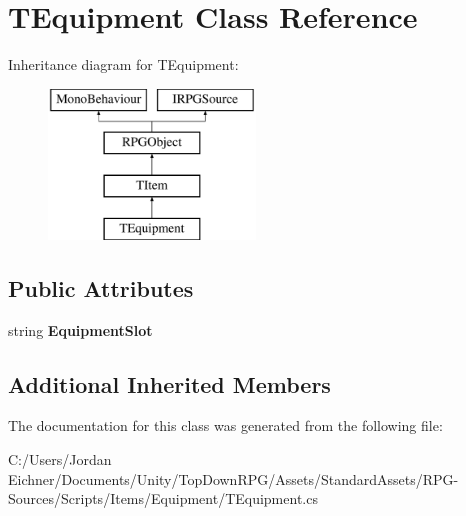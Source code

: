 \hypertarget{class_t_equipment}{}\section{T\+Equipment Class Reference}
\label{class_t_equipment}
Inheritance diagram for T\+Equipment\+:\begin{figure}[H]
\begin{center}
\leavevmode
\includegraphics[height=4.000000cm]{class_t_equipment}
\end{center}
\end{figure}
\subsection*{Public Attributes}
\begin{DoxyCompactItemize}
\item 
\hypertarget{class_t_equipment_a0649573d41f70f840da2b3888af650b3}{}string {\bfseries Equipment\+Slot}\label{class_t_equipment_a0649573d41f70f840da2b3888af650b3}

\end{DoxyCompactItemize}
\subsection*{Additional Inherited Members}


The documentation for this class was generated from the following file\+:\begin{DoxyCompactItemize}
\item 
C\+:/\+Users/\+Jordan Eichner/\+Documents/\+Unity/\+Top\+Down\+R\+P\+G/\+Assets/\+Standard\+Assets/\+R\+P\+G-\/\+Sources/\+Scripts/\+Items/\+Equipment/T\+Equipment.\+cs\end{DoxyCompactItemize}
